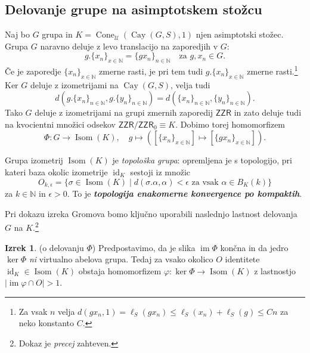 \documentclass[11pt]{book}
\def\NN{\mathbb{N}}
\def\UU{\mathcal{U}}
\def\ZR{\mathsf{ZZR}}
\DeclareMathOperator\image{im}
\DeclareMathOperator\Cay{Cay}
\DeclareMathOperator\Isom{Isom}
\DeclareMathOperator\id{id}
\DeclareMathOperator\Cone{Cone}
\def\definicija{\color{rdeca}\bf\em}
\theoremstyle{definition}
\theoremstyle{zgled}
\theoremstyle{odprtproblem}
\theoremstyle{domacanaloga}
\theoremstyle{izrek}
\newtheorem*{izrek}{Izrek}
\begin{document}
\subsection{Delovanje grupe na asimptotskem stožcu}

Naj bo $G$ grupa in $K = \Cone_\UU(\Cay(G,S), 1)$ njen asimptotski stožec. Grupa $G$ naravno deluje z levo translacijo na zaporedjih v $G$:
\[
g.\{ x_n \}_{x \in \NN} = \{ g x_n \}_{n \in \NN} \quad 
\text{za $g, x_n \in G$}.
\]
Če je zaporedje $\{ x_n \}_{x \in \NN}$ zmerne rasti, je pri tem tudi $g. \{ x_n \}_{x \in \NN}$ zmerne rasti.\footnote{Za vsak $n$ velja $d(g x_n, 1) = \ell_S(gx_n) \leq \ell_S(x_n) + \ell_S(g) \leq Cn$ za neko konstanto $C$.} Ker $G$ deluje z izometrijami na $\Cay(G,S)$, velja tudi 
\[
d(g.\{ x_n \}_{n \in \NN}, g.\{ y_n \}_{n \in \NN}) = d(\{ x_n \}_{n \in \NN}, \{ y_n \}_{n \in \NN}).\]
Tako $G$ deluje z izometrijami na grupi zmernih zaporedij $\ZR$ in zato deluje tudi na kvocientni množici odsekov $\ZR / \ZR_0 \equiv K$. Dobimo torej homomorfizem
\[
\Phi \colon G \to \Isom(K), \quad
g \mapsto ([\{ x_n \}_{x \in \NN}] \mapsto [\{ g x_n \}_{x \in \NN}]).
\]

Grupa izometrij $\Isom(K)$ je {\em topološka grupa}: opremljena je s topologijo, pri kateri baza okolic izometrije $\id_K$ sestoji iz množic
\[
O_{k, \epsilon} = \{ \sigma \in \Isom(K) \mid d(\sigma.\alpha, \alpha) < \epsilon \text{ za vsak $\alpha \in B_K(k)$} \}
\]
za $k \in \NN$ in $\epsilon > 0$. To je {\definicija topologija enakomerne konvergence po kompaktih}.

Pri dokazu izreka Gromova bomo ključno uporabili naslednjo lastnost delovanja $G$ na $K$.\footnote{Dokaz je {\em precej} zahteven.}

\begin{izrek}{\sc (o delovanju $\Phi$)}
Predpostavimo, da je slika $\image \Phi$ končna in da jedro $\ker \Phi$ {\em ni} virtualno abelova grupa. Tedaj za vsako okolico $O$ identitete $\id_K \in \Isom(K)$ obstaja homomorfizem $\varphi \colon \ker \Phi \to \Isom(K)$ z lastnostjo $|\image \varphi \cap O| > 1$.
\end{izrek}
\end{document}
